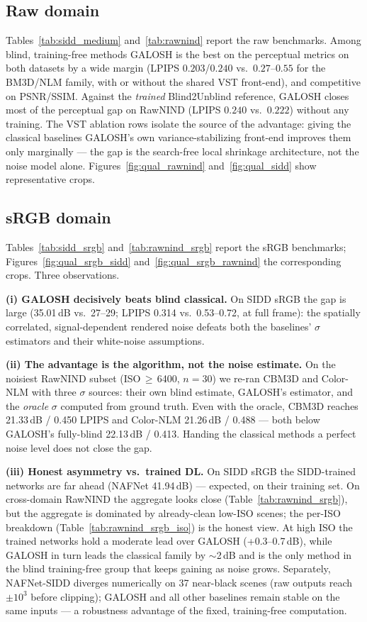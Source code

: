 \documentclass[10pt,twocolumn]{article}
\begin{document}
\subsection{Raw domain}\label{sec:rawres}
Tables~\ref{tab:sidd_medium} and~\ref{tab:rawnind} report the raw benchmarks.
Among blind, training-free methods GALOSH is the best on the perceptual
metrics on both datasets by a wide margin (LPIPS $0.203$/$0.240$ vs.\
$0.27$--$0.55$ for the BM3D/NLM family, with or without the shared VST
front-end), and competitive on PSNR/SSIM. Against the \emph{trained}
Blind2Unblind reference, GALOSH closes most of the perceptual gap on RawNIND
(LPIPS $0.240$ vs.\ $0.222$) without any training. The VST ablation rows
isolate the source of the advantage: giving the classical baselines GALOSH's
own variance-stabilizing front-end improves them only marginally --- the gap
is the search-free local shrinkage architecture, not the noise model alone.
Figures~\ref{fig:qual_rawnind} and~\ref{fig:qual_sidd} show representative
crops.

\subsection{sRGB domain}\label{sec:srgb}
Tables~\ref{tab:sidd_srgb} and~\ref{tab:rawnind_srgb} report the sRGB
benchmarks; Figures~\ref{fig:qual_srgb_sidd} and~\ref{fig:qual_srgb_rawnind}
the corresponding crops. Three observations.

\textbf{(i) GALOSH decisively beats blind classical.} On SIDD sRGB the gap is
large (35.01\,dB vs.\ 27--29; LPIPS 0.314 vs.\ 0.53--0.72, at full frame): the spatially
correlated, signal-dependent rendered noise defeats both the baselines'
$\sigma$ estimators and their white-noise assumptions.

\textbf{(ii) The advantage is the algorithm, not the noise estimate.} On the
noisiest RawNIND subset (ISO\,$\geq$\,6400, $n{=}30$) we re-ran CBM3D and
Color-NLM with three $\sigma$ sources: their own blind estimate, GALOSH's
estimator, and the \emph{oracle} $\sigma$ computed from ground truth. Even
with the oracle, CBM3D reaches 21.33\,dB / 0.450 LPIPS and Color-NLM
21.26\,dB / 0.488 --- both below GALOSH's fully-blind 22.13\,dB / 0.413.
Handing the classical methods a perfect noise level does not close the gap.

\textbf{(iii) Honest asymmetry vs.\ trained DL.} On SIDD sRGB the
SIDD-trained networks are far ahead (NAFNet 41.94\,dB) --- expected, on their
training set. On cross-domain RawNIND the aggregate looks close
(Table~\ref{tab:rawnind_srgb}), but the aggregate is dominated by
already-clean low-ISO scenes; the per-ISO breakdown
(Table~\ref{tab:rawnind_srgb_iso}) is the honest view. At high ISO the
trained networks hold a moderate lead over GALOSH (+0.3--0.7\,dB), while
GALOSH in turn leads the classical family by $\sim$2\,dB and is the only
method in the blind training-free group that keeps gaining as noise grows.
Separately, NAFNet-SIDD diverges numerically on 37 near-black scenes (raw
outputs reach $\pm10^3$ before clipping); GALOSH and all other baselines remain stable on the same
inputs --- a robustness advantage of the fixed, training-free computation.
\end{document}
